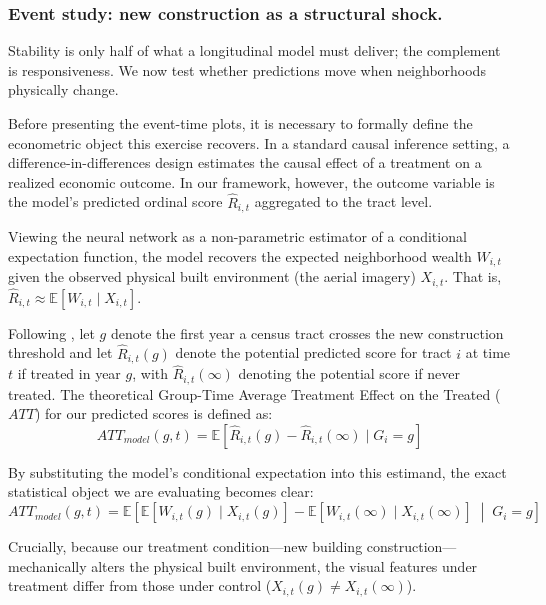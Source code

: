 \documentclass[conference]{IEEEtran}
\begin{document}
\subsubsection{Event study: new construction as a structural shock.}

Stability is only half of what a longitudinal model must deliver; the complement is responsiveness. We now test whether predictions move when neighborhoods physically change. 

Before presenting the event-time plots, it is necessary to formally define the econometric object this exercise recovers. In a standard causal inference setting, a difference-in-differences design estimates the causal effect of a treatment on a realized economic outcome. In our framework, however, the outcome variable is the model's predicted ordinal score $\hat{R}_{i,t}$ aggregated to the tract level. 

Viewing the neural network as a non-parametric estimator of a conditional expectation function, the model recovers the expected neighborhood wealth $W_{i,t}$ given the observed physical built environment (the aerial imagery) $X_{i,t}$. That is, $\hat{R}_{i,t} \approx \mathbb{E}[W_{i,t} \mid X_{i,t}]$. 

Following \citet{callaway2021difference}, let $g$ denote the first year a census tract crosses the new construction threshold and let $\hat{R}_{i,t}(g)$ denote the potential predicted score for tract $i$ at time $t$ if treated in year $g$, with $\hat{R}_{i,t}(\infty)$ denoting the potential score if never treated. The theoretical Group-Time Average Treatment Effect on the Treated ($ATT$) for our predicted scores is defined as:
\begin{equation}
    ATT_{model}(g,t) = \mathbb{E}\left[ \hat{R}_{i,t}(g) - \hat{R}_{i,t}(\infty) \mid G_i = g \right]
\end{equation}

By substituting the model's conditional expectation into this estimand, the exact statistical object we are evaluating becomes clear:
\begin{equation}
    ATT_{model}(g,t) = \mathbb{E} \left[ \mathbb{E}[W_{i,t}(g) \mid X_{i,t}(g)] - \mathbb{E}[W_{i,t}(\infty) \mid X_{i,t}(\infty)] \;\middle|\; G_i = g \right]
\end{equation}

Crucially, because our treatment condition---new building construction---mechanically alters the physical built environment, the visual features under treatment differ from those under control ($X_{i,t}(g) \neq X_{i,t}(\infty)$). 
\end{document}
